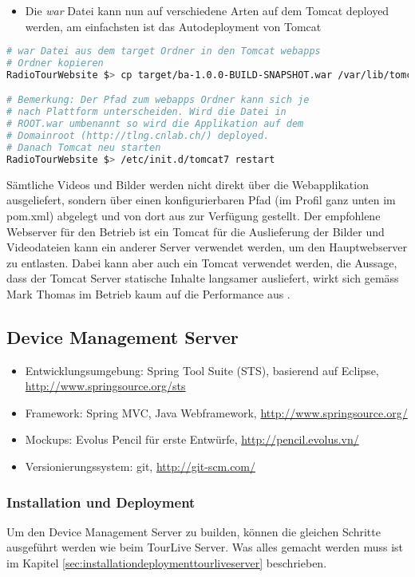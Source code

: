 \begin{itemize}
\item Die \textit{war} Datei kann nun auf verschiedene Arten auf dem Tomcat deployed werden, am einfachsten ist das Autodeployment von Tomcat
\end{itemize}
\begin{lstlisting}[language=Bash, caption=Deployment auf Tomcat]
# war Datei aus dem target Ordner in den Tomcat webapps
# Ordner kopieren
RadioTourWebsite $> cp target/ba-1.0.0-BUILD-SNAPSHOT.war /var/lib/tomcat7/webapps/ROOT.war

# Bemerkung: Der Pfad zum webapps Ordner kann sich je
# nach Plattform unterscheiden. Wird die Datei in
# ROOT.war umbenannt so wird die Applikation auf dem
# Domainroot (http://tlng.cnlab.ch/) deployed.
# Danach Tomcat neu starten
RadioTourWebsite $> /etc/init.d/tomcat7 restart

\end{lstlisting}

Sämtliche Videos und Bilder werden nicht direkt über die Webapplikation ausgeliefert, sondern über einen konfigurierbaren Pfad (im Profil ganz unten im pom.xml) abgelegt und von dort aus zur Verfügung gestellt. Der empfohlene Webserver für den Betrieb ist ein Tomcat für die Auslieferung der Bilder und Videodateien kann ein anderer Server verwendet werden, um den Hauptwebserver zu entlasten. Dabei kann aber auch ein Tomcat verwendet werden, die Aussage, dass der Tomcat Server statische Inhalte langsamer ausliefert, wirkt sich gemäss Mark Thomas im Betrieb kaum auf die Performance aus \cite{thomas2010}.

\subsection{Device Management Server}
\begin{itemize}
\item Entwicklungsumgebung: Spring Tool Suite (STS), basierend auf Eclipse, \url{http://www.springsource.org/sts}
\item Framework: Spring MVC, Java Webframework, \url{http://www.springsource.org/}
\item Mockups: Evolus Pencil für erste Entwürfe, \url{http://pencil.evolus.vn/}
\item Versionierungssystem: git, \url{http://git-scm.com/}
\end{itemize}

\subsubsection{Installation und Deployment}
Um den Device Management Server zu builden, können die gleichen Schritte ausgeführt werden wie beim TourLive Server. Was alles gemacht werden muss ist im Kapitel \ref{sec:installationdeploymenttourliveserver} beschrieben.

